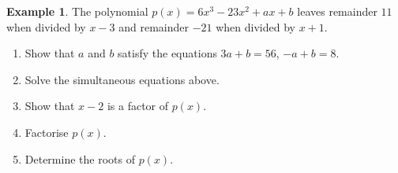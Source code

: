 \documentclass[
  english,
  12pt,
  oneside]{book}
\providecommand{\tightlist}{%
  \setlength{\itemsep}{0pt}\setlength{\parskip}{0pt}}
\theoremstyle{definition}
\theoremstyle{definition}
\newtheorem{example}{Example}[chapter]
\theoremstyle{definition}
\theoremstyle{definition}
\theoremstyle{remark}
\begin{document}
\begin{example}

The polynomial \(p(x)=6x^3-23x^2+ax+b\) leaves remainder \(11\) when divided by \(x-3\) and remainder \(-21\) when divided by \(x+1\).

\begin{enumerate}
\def\labelenumi{(\roman{enumi})}
\tightlist
\item
  Show that \(a\) and \(b\) satisfy the equations \(3a+b=56\), \(-a+b=8\).
\item
  Solve the simultaneous equations above.
\item
  Show that \(x-2\) is a factor of \(p(x)\).
\item
  Factorise \(p(x)\).
\item
  Determine the roots of \(p(x)\).
\end{enumerate}

\end{example}
\end{document}
